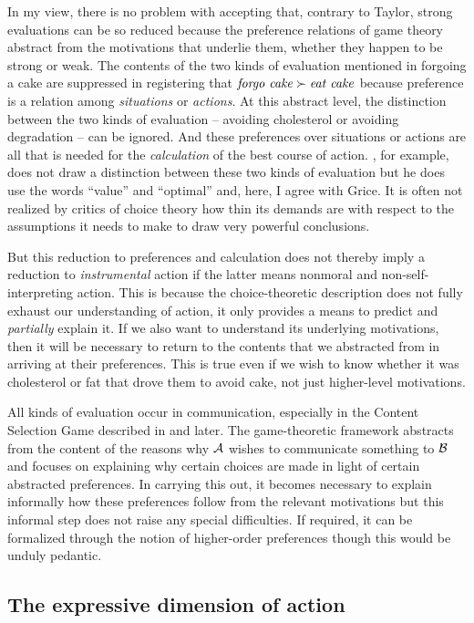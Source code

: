 In my view, there is no problem with accepting that, contrary to Taylor, strong evaluations can be so reduced because the preference relations of game theory abstract from the motivations that underlie them, whether they happen to be strong or weak. The contents of the two kinds of evaluation mentioned in forgoing a cake are suppressed in registering that $\hbox{\emph{forgo cake}} \succ \hbox{\emph{eat cake}}$ because preference is a relation among \emph{situations} or \emph{actions}. At this abstract level, the distinction between the two kinds of evaluation -- avoiding cholesterol or avoiding degradation -- can be ignored. And these preferences over situations or actions are all that is needed for the \emph{calculation} of the best course of action. \citet{grice:mr}, for example, does not draw a distinction between these two kinds of evaluation but he does use the words ``value'' and ``optimal'' and, here, I agree with Grice. It is often not realized by critics of choice theory how thin its demands are with respect to the assumptions it needs to make to draw very powerful conclusions.

But this reduction to preferences and calculation does not thereby imply a reduction to \emph{instrumental} action if the latter means nonmoral and non-self-in\-ter\-pre\-ting action. This is because the choice-theoretic description does not fully exhaust our understanding of action, it only provides a means to predict and \emph{partially} explain it. If we also want to understand its underlying motivations, then it will be necessary to return to the contents that we abstracted from in arriving at their preferences. This is true even if we wish to know whether it was cholesterol or fat that drove them to avoid cake, not just higher-level motivations.

All kinds of evaluation occur in communication, especially in the Content Selection Game described in  and later. The game-theoretic framework abstracts from the content of the reasons why $\cal A$ wishes to communicate something to $\cal B$ and focuses on explaining why certain choices are made in light of certain abstracted preferences. In carrying this out, it becomes necessary to explain informally how these preferences follow from the relevant motivations but this informal step does not raise any special difficulties. If required, it can be formalized through the notion of higher-order preferences though this would be unduly pedantic.


\subsection{The expressive dimension of action}

